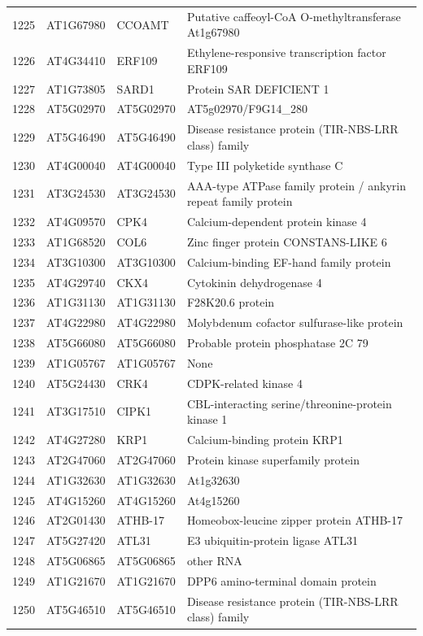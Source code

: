 \documentclass[11pt]{article}
\begin{document}
\begin{center}
\begin{tabular}{rlll}
1225 & AT1G67980 & CCOAMT & Putative caffeoyl-CoA O-methyltransferase At1g67980\\
1226 & AT4G34410 & ERF109 & Ethylene-responsive transcription factor ERF109\\
1227 & AT1G73805 & SARD1 & Protein SAR DEFICIENT 1\\
1228 & AT5G02970 & AT5G02970 & AT5g02970/F9G14\_280\\
1229 & AT5G46490 & AT5G46490 & Disease resistance protein (TIR-NBS-LRR class) family\\
1230 & AT4G00040 & AT4G00040 & Type III polyketide synthase C\\
1231 & AT3G24530 & AT3G24530 & AAA-type ATPase family protein / ankyrin repeat family protein\\
1232 & AT4G09570 & CPK4 & Calcium-dependent protein kinase 4\\
1233 & AT1G68520 & COL6 & Zinc finger protein CONSTANS-LIKE 6\\
1234 & AT3G10300 & AT3G10300 & Calcium-binding EF-hand family protein\\
1235 & AT4G29740 & CKX4 & Cytokinin dehydrogenase 4\\
1236 & AT1G31130 & AT1G31130 & F28K20.6 protein\\
1237 & AT4G22980 & AT4G22980 & Molybdenum cofactor sulfurase-like protein\\
1238 & AT5G66080 & AT5G66080 & Probable protein phosphatase 2C 79\\
1239 & AT1G05767 & AT1G05767 & None\\
1240 & AT5G24430 & CRK4 & CDPK-related kinase 4\\
1241 & AT3G17510 & CIPK1 & CBL-interacting serine/threonine-protein kinase 1\\
1242 & AT4G27280 & KRP1 & Calcium-binding protein KRP1\\
1243 & AT2G47060 & AT2G47060 & Protein kinase superfamily protein\\
1244 & AT1G32630 & AT1G32630 & At1g32630\\
1245 & AT4G15260 & AT4G15260 & At4g15260\\
1246 & AT2G01430 & ATHB-17 & Homeobox-leucine zipper protein ATHB-17\\
1247 & AT5G27420 & ATL31 & E3 ubiquitin-protein ligase ATL31\\
1248 & AT5G06865 & AT5G06865 & other RNA\\
1249 & AT1G21670 & AT1G21670 & DPP6 amino-terminal domain protein\\
1250 & AT5G46510 & AT5G46510 & Disease resistance protein (TIR-NBS-LRR class) family\\

\end{tabular}
\end{center}
\end{document}
